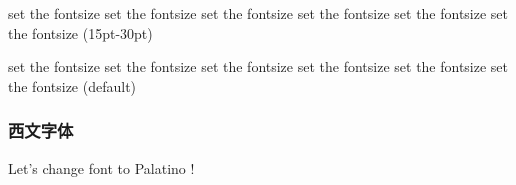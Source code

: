 \documentclass{ctexart}
\begin{document}

            {\fontsize{15}{30}\selectfont set the fontsize set the fontsize set the fontsize set the fontsize set the fontsize set the fontsize (15pt-30pt)\par}

            set the fontsize set the fontsize set the fontsize set the fontsize set the fontsize set the fontsize (default)


        \subsubsection{西文字体}
            \newcommand*{\myfont}[2]{{\fontfamily{#1}\selectfont #2}}
            Let's change font to \myfont{lmss}{Palatino} !
\end{document}
